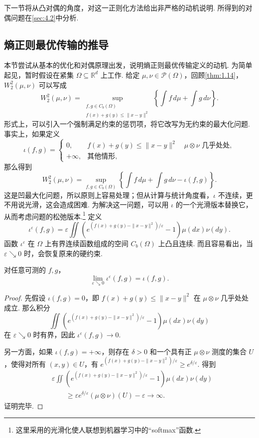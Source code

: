 下一节将从凸对偶的角度，对这一正则化方法给出非严格的动机说明. 所得到的对偶问题在\autoref{sec:4.2}中分析.

\subsection{熵正则最优传输的推导}\label{sec:4.1}
本节尝试从基本的优化和对偶原理出发，说明熵正则最优传输定义的动机. 为简单起见，暂时假设在紧集 $\Omega\subseteq\mathbb R^d$ 上工作. 给定 $\mu,\nu\in\mathcal P(\Omega)$，回顾\autoref{thm:1.14}，$W_2^2(\mu,\nu)$ 可以写成
$$W_2^2(\mu,\nu)=\sup_{\substack{f,g\in C_b(\Omega)\\f(x)+g(y)\le\|x-y\|^2}}
\left\{\int f\,d\mu+\int g\,d\nu\right\}.$$
形式上，可以引入一个强制满足约束的惩罚项，将它改写为无约束的最大化问题. 事实上，如果定义
$$\iota(f,g)=\begin{cases}0,&f(x)+g(y)\le\|x-y\|^2\quad\mu\otimes\nu\text{ 几乎处处},\\
+\infty,&\text{其他情形},\end{cases}$$
那么得到
$$W_2^2(\mu,\nu)=\sup_{f,g\in C_b(\Omega)}
\left\{\int f\,d\mu+\int g\,d\nu-\iota(f,g)\right\}.$$
这是凹最大化问题，所以原则上容易处理；但从计算与统计角度看，$\iota$ 不连续，更不用说光滑，这会造成困难. 为解决这一问题，可以用 $\iota$ 的一个光滑版本替换它，从而考虑问题的松弛版本.\footnote{这里采用的光滑化使人联想到机器学习中的“softmax”函数.} 定义
$$\iota^\varepsilon(f,g)=\varepsilon\iint
\left(e^{(f(x)+g(y)-\|x-y\|^2)/\varepsilon}-1\right)\mu(dx)\nu(dy).$$
函数 $\iota^\varepsilon$ 在 $\Omega$ 上有界连续函数组成的空间 $C_b(\Omega)$ 上凸且连续. 而且容易看出，当 $\varepsilon\searrow0$ 时，会恢复原来的硬约束.
\begin{lemma}\label{lem:4.1}
对任意可测的 $f,g$，
$$\lim_{\varepsilon\searrow0}\iota^\varepsilon(f,g)=\iota(f,g).$$
\end{lemma}
\begin{proof}
先假设 $\iota(f,g)=0$，即 $f(x)+g(y)\le\|x-y\|^2$ 在 $\mu\otimes\nu$ 几乎处处成立. 那么积分
$$\iint\left(e^{(f(x)+g(y)-\|x-y\|^2)/\varepsilon}-1\right)\mu(dx)\nu(dy)$$
在 $\varepsilon\searrow0$ 时有界，因此 $\iota^\varepsilon(f,g)\to0$.

另一方面，如果 $\iota(f,g)=+\infty$，则存在 $\delta>0$ 和一个具有正 $\mu\otimes\nu$ 测度的集合 $U$，使得对所有 $(x,y)\in U$，有 $e^{(f(x)+g(y)-\|x-y\|^2)/\varepsilon}\ge e^{\delta/\varepsilon}$. 得到
$$\begin{aligned}
&\varepsilon\iint\left(e^{(f(x)+g(y)-\|x-y\|^2)/\varepsilon}-1\right)\mu(dx)\nu(dy)\\
&\qquad\ge\varepsilon e^{\delta/\varepsilon}(\mu\otimes\nu)(U)-\varepsilon\longrightarrow\infty.
\end{aligned}$$
证明完毕.
\end{proof}

